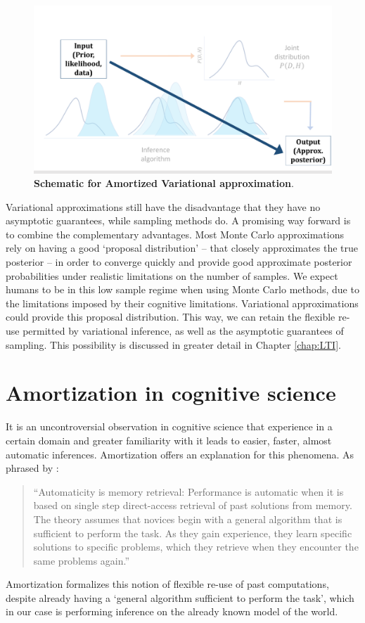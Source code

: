 \begin{figure}[t!]
\centering
\includegraphics[width = \textwidth]{figures/var_schematic_amort.pdf}
\caption{\textbf{Schematic for Amortized Variational approximation}. }
\label{fig:var_schematic_amort}
\end{figure}

Variational approximations still have the disadvantage that they have no asymptotic guarantees, while sampling methods do. A promising way forward is to combine the complementary advantages. Most Monte Carlo approximations rely on having a good `proposal distribution' -- that closely approximates the true posterior -- in order to converge quickly and provide good approximate posterior probabilities under realistic limitations on the number of samples. We expect humans to be in this low sample regime when using Monte Carlo methods, due to the limitations imposed by their cognitive limitations. Variational approximations could provide this proposal distribution. This way, we can retain the flexible re-use permitted by variational inference, as well as the asymptotic guarantees of sampling. This possibility is discussed in greater detail in Chapter \ref{chap:LTI}.

\section{Amortization in cognitive science}

It is an uncontroversial observation in cognitive science that experience in a certain domain and greater familiarity with it leads to easier, faster, almost automatic inferences. Amortization offers an explanation for this phenomena. As phrased by \citet{logan1988toward}:
\begin{quote}
``Automaticity is memory retrieval: Performance is automatic when it is based on single step direct-access retrieval of past solutions from memory. The theory assumes that novices begin with a general algorithm that is sufficient to perform the task. As they gain experience, they learn specific solutions to specific problems, which they retrieve when they encounter the same problems again.''
\end{quote}
Amortization formalizes this notion of flexible re-use of past computations, despite already having a `general algorithm sufficient to perform the task', which in our case is performing inference on the already known model of the world. 

